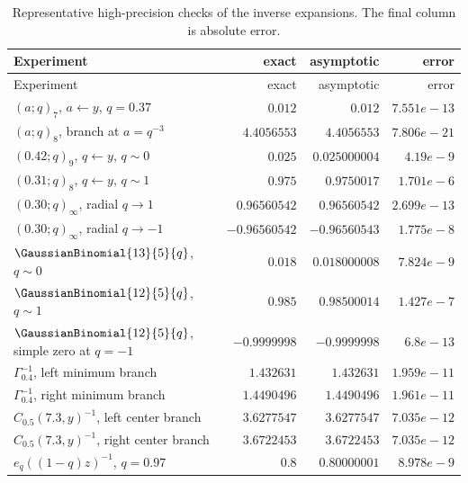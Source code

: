 \begin{longtable}{@{}p{}rrr@{}}
\caption{Representative high-precision checks of the inverse expansions. The final column is absolute error.\label{tab:numerical-checks}}\\
\toprule
Experiment & exact & asymptotic & error\\
\midrule
\endfirsthead
\toprule
Experiment & exact & asymptotic & error\\
\midrule
\endhead
$(a;q)_7$, $a\leftarrow y$, $q=0.37$ & $0.012$ & $0.012$ & $7.551e-13$\\
$(a;q)_8$, branch at $a=q^{-3}$ & $4.4056553$ & $4.4056553$ & $7.806e-21$\\
$(0.42;q)_9$, $q\leftarrow y$, $q\sim0$ & $0.025$ & $0.025000004$ & $4.19e-9$\\
$(0.31;q)_8$, $q\leftarrow y$, $q\sim1$ & $0.975$ & $0.9750017$ & $1.701e-6$\\
$(0.30;q)_\infty$, radial $q\to1$ & $0.96560542$ & $0.96560542$ & $2.699e-13$\\
$(0.30;q)_\infty$, radial $q\to-1$ & $-0.96560542$ & $-0.96560543$ & $1.775e-8$\\
$\GaussianBinomial{13}{5}{q}$, $q\sim0$ & $0.018$ & $0.018000008$ & $7.824e-9$\\
$\GaussianBinomial{12}{5}{q}$, $q\sim1$ & $0.985$ & $0.98500014$ & $1.427e-7$\\
$\GaussianBinomial{12}{5}{q}$, simple zero at $q=-1$ & $-0.9999998$ & $-0.9999998$ & $6.8e-13$\\
$\Gamma_{0.4}^{-1}$, left minimum branch & $1.432631$ & $1.432631$ & $1.959e-11$\\
$\Gamma_{0.4}^{-1}$, right minimum branch & $1.4490496$ & $1.4490496$ & $1.961e-11$\\
$C_{0.5}(7.3,y)^{-1}$, left center branch & $3.6277547$ & $3.6277547$ & $7.035e-12$\\
$C_{0.5}(7.3,y)^{-1}$, right center branch & $3.6722453$ & $3.6722453$ & $7.035e-12$\\
$e_q((1-q)z)^{-1}$, $q=0.97$ & $0.8$ & $0.80000001$ & $8.978e-9$\\
\bottomrule
\end{longtable}
